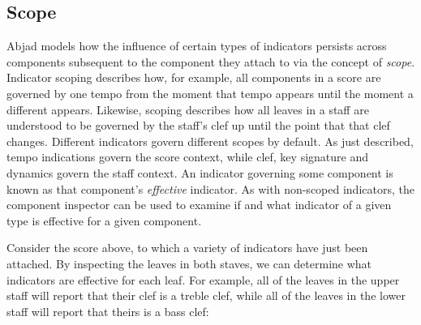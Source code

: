 \subsection{Scope}

Abjad models how the influence of certain types of indicators persists across
components subsequent to the component they attach to via the concept of
\emph{scope}. Indicator scoping describes how, for example, all components in a
score are governed by one tempo from the moment that tempo appears until the
moment a different appears. Likewise, scoping describes how all leaves in a
staff are understood to be governed by the staff's clef up until the point that
that clef changes. Different indicators govern different scopes by default. As
just described, tempo indications govern the score context, while clef, key
signature and dynamics govern the staff context. An indicator governing some
component is known as that component's \emph{effective} indicator. As with
non-scoped indicators, the component inspector can be used to examine if and
what indicator of a given type is effective for a given component.

Consider the score above, to which a variety of indicators have just been
attached. By inspecting the leaves in both staves, we can determine what
indicators are effective for each leaf. For example, all of the leaves in the
upper staff will report that their clef is a treble clef, while all of the
leaves in the lower staff will report that theirs is a bass clef:

\begin{comment}
<abjad>
for leaf in score['Upper Staff'].select_leaves():
    clef = inspect_(leaf).get_effective(Clef)
    print(leaf, clef)

for leaf in score['Lower Staff'].select_leaves():
    clef = inspect_(leaf).get_effective(Clef)
    print(leaf, clef)
</abjad>
\end{comment}

